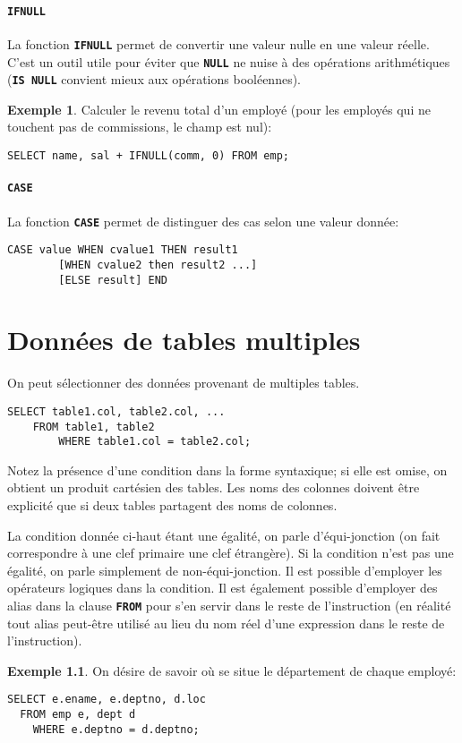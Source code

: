 \documentclass[a4paper, 12pt]{report}
\newcommand{\textSQL}[1]{\texttt{\textbf{#1}}}
\theoremstyle{definition} \newtheorem{ex}{Exemple}
\begin{document}
\subsubsection{\textSQL{IFNULL}}
La fonction \textSQL{IFNULL} permet de convertir une valeur nulle en une valeur réelle. C'est un outil utile pour éviter que \textSQL{NULL} ne nuise à des opérations arithmétiques (\textSQL{IS NULL} convient mieux aux opérations booléennes).
\begin{ex}
Calculer le revenu total d'un employé (pour les employés qui ne touchent pas de commissions, le champ est nul):
	\begin{lstlisting}[frame=single]
 SELECT name, sal + IFNULL(comm, 0) FROM emp;
\end{lstlisting}
\end{ex}

\subsubsection{\textSQL{CASE}}
La fonction \textSQL{CASE} permet de distinguer des cas selon une valeur donnée:
	\begin{lstlisting}[frame=single]
 CASE value WHEN cvalue1 THEN result1
		[WHEN cvalue2 then result2 ...]
		[ELSE result] END
\end{lstlisting}

\chapter{Données de tables multiples}
On peut sélectionner des données provenant de multiples tables.
	\begin{lstlisting}[frame=single]
 SELECT table1.col, table2.col, ...
    FROM table1, table2
		WHERE table1.col = table2.col;
\end{lstlisting}
Notez la présence d'une condition dans la forme syntaxique; si elle est omise, on obtient un produit cartésien des tables. Les noms des colonnes doivent être explicité que si deux tables partagent des noms de colonnes.

La condition donnée ci-haut étant une égalité, on parle d'équi-jonction (on fait correspondre à une clef primaire une clef étrangère). Si la condition n'est pas une égalité, on parle simplement de non-équi-jonction. Il est possible d'employer les opérateurs logiques dans la condition. Il est également possible d'employer des alias dans la clause \textSQL{FROM} pour s'en servir dans le reste de l'instruction (en réalité tout alias peut-être utilisé au lieu du nom réel d'une expression dans le reste de l'instruction).
\begin{ex}
On désire de savoir où se situe le département de chaque employé:
\begin{lstlisting}[frame=single]
SELECT e.ename, e.deptno, d.loc
  FROM emp e, dept d
	WHERE e.deptno = d.deptno;
\end{lstlisting}
\end{ex}
\end{document}
